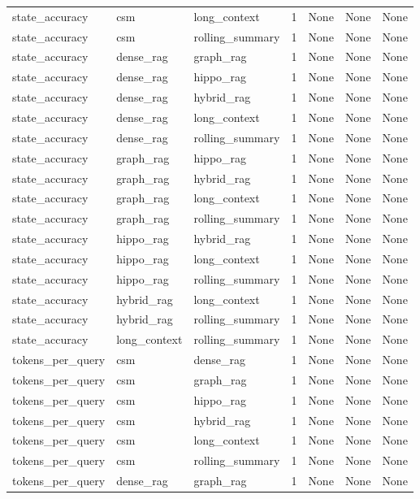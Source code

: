 \begin{tabular}{lllllll}
state\_accuracy & csm & long\_context & 1 & None & None & None \\
state\_accuracy & csm & rolling\_summary & 1 & None & None & None \\
state\_accuracy & dense\_rag & graph\_rag & 1 & None & None & None \\
state\_accuracy & dense\_rag & hippo\_rag & 1 & None & None & None \\
state\_accuracy & dense\_rag & hybrid\_rag & 1 & None & None & None \\
state\_accuracy & dense\_rag & long\_context & 1 & None & None & None \\
state\_accuracy & dense\_rag & rolling\_summary & 1 & None & None & None \\
state\_accuracy & graph\_rag & hippo\_rag & 1 & None & None & None \\
state\_accuracy & graph\_rag & hybrid\_rag & 1 & None & None & None \\
state\_accuracy & graph\_rag & long\_context & 1 & None & None & None \\
state\_accuracy & graph\_rag & rolling\_summary & 1 & None & None & None \\
state\_accuracy & hippo\_rag & hybrid\_rag & 1 & None & None & None \\
state\_accuracy & hippo\_rag & long\_context & 1 & None & None & None \\
state\_accuracy & hippo\_rag & rolling\_summary & 1 & None & None & None \\
state\_accuracy & hybrid\_rag & long\_context & 1 & None & None & None \\
state\_accuracy & hybrid\_rag & rolling\_summary & 1 & None & None & None \\
state\_accuracy & long\_context & rolling\_summary & 1 & None & None & None \\
tokens\_per\_query & csm & dense\_rag & 1 & None & None & None \\
tokens\_per\_query & csm & graph\_rag & 1 & None & None & None \\
tokens\_per\_query & csm & hippo\_rag & 1 & None & None & None \\
tokens\_per\_query & csm & hybrid\_rag & 1 & None & None & None \\
tokens\_per\_query & csm & long\_context & 1 & None & None & None \\
tokens\_per\_query & csm & rolling\_summary & 1 & None & None & None \\
tokens\_per\_query & dense\_rag & graph\_rag & 1 & None & None & None \\

\end{tabular}
